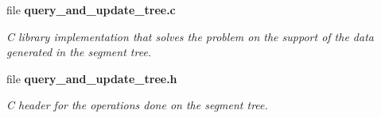 \begin{DoxyCompactItemize}
file \textbf{ query\+\_\+and\+\_\+update\+\_\+tree.\+c}
\begin{DoxyCompactList}\small\item\em C library implementation that solves the problem on the support of the data generated in the segment tree. \end{DoxyCompactList}\item 
file \textbf{ query\+\_\+and\+\_\+update\+\_\+tree.\+h}
\begin{DoxyCompactList}\small\item\em C header for the operations done on the segment tree. \end{DoxyCompactList}\end{DoxyCompactItemize}

